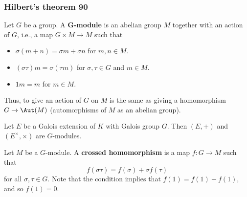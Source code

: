 \subsubsection{Hilbert's theorem 90}
Let $G$ be a group. A \textbf{$\bm{G}$-module} is an abelian group $M$ together with an action of $G$, i.e., a map $G\times M\to M$ such that
\begin{itemize}
\item $\sigma(m+n)=\sigma m+\sigma n$ for $m,n\in M$.
\item $(\sigma\tau)m=\sigma(\tau m)$ for $\sigma,\tau\in G$ and $m\in M$.
\item $1m=m$ for $m\in M$.
\end{itemize}
Thus, to give an action of $G$ on $M$ is the same as giving a homomorphism $G\to\Aut(M)$ (automorphisms of $M$ as an abelian group).
\begin{example}
Let $E$ be a Galois extension of $K$ with Galois group $G$. Then $(E,+)$ and $(E^\times,\times)$ are $G$-modules.
\end{example}
Let $M$ be a $G$-module. A \textbf{crossed homomorphism} is a map $f:G\to  M$ such that
\[f(\sigma\tau)=f(\sigma)+\sigma f(\tau)\]
for all $\sigma,\tau\in G$. Note that the condition implies that $f(1)=f(1)+f(1)$, and so $f(1)=0$.
